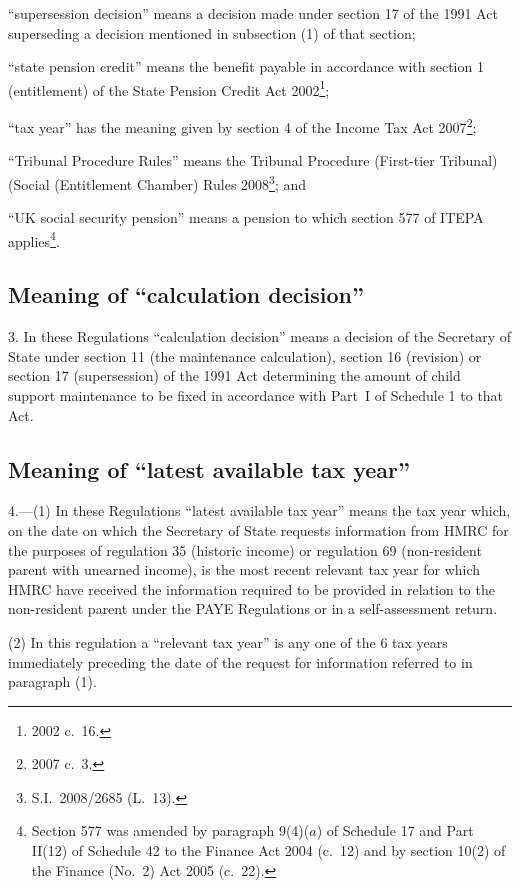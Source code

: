 \documentclass[12pt,a4paper]{article}
\begin{document}
\begin{enumerate}
“supersession decision” means a decision made under section 17 of the 1991 Act superseding a decision mentioned in subsection (1) of that section;

“state pension credit” means the benefit payable in accordance with section 1 (entitlement) of the State Pension Credit Act 2002\footnote{2002 c.~16.};

“tax year” has the meaning given by section 4 of the Income Tax Act 2007\footnote{2007 c.~3.};

“Tribunal Procedure Rules” means the Tribunal Procedure (First-tier Tribunal) (Social (Entitlement Chamber) Rules 2008\footnote{S.I.~2008/2685 (L.~13).}; and

“UK social security pension” means a pension to which section 577 of ITEPA applies\footnote{Section 577 was amended by paragraph 9(4)($a$)  of Schedule 17 and Part II(12) of Schedule 42 to the Finance Act 2004 (c.~12) and by section 10(2) of the Finance (No.~2) Act 2005 (c.~22).}.
\end{enumerate}

\subsection[3. Meaning of “calculation decision”]{Meaning of “calculation decision”}

3.  In these Regulations “calculation decision” means a decision of the Secretary of State under section 11 (the maintenance calculation), section 16 (revision) or section 17 (supersession) of the 1991 Act determining the amount of child support maintenance to be fixed in accordance with Part~I of Schedule 1 to that Act.

\subsection[4. Meaning of “latest available tax year”]{Meaning of “latest available tax year”}

4.---(1)  In these Regulations “latest available tax year” means the tax year which, on the date on which the Secretary of State requests information from HMRC for the purposes of regulation 35 (historic income) or regulation 69 (non-resident parent with unearned income), is the most recent relevant tax year for which HMRC have received the information required to be provided in relation to the non-resident parent under the PAYE Regulations or in a self-assessment return.

(2) In this regulation a “relevant tax year” is any one of the 6 tax years immediately preceding the date of the request for information referred to in paragraph (1).
\end{document}

